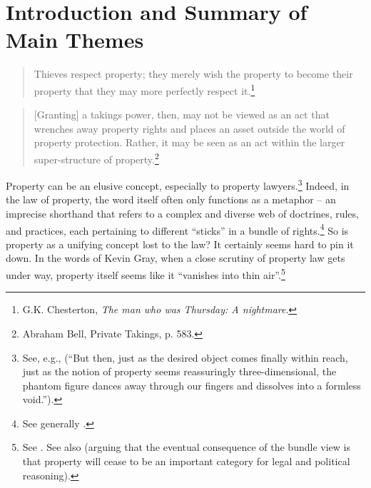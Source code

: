 \chapter{Introduction and Summary of Main Themes}\label{chap:intro}

\begin{quote}
Thieves respect property; they merely wish the property to become their property that they may more perfectly respect it.\footnote{G.K. Chesterton, {\it The man who was Thursday: A nightmare}.}
\end{quote}
\begin{quote}
[Granting] a takings power, then, may not be viewed as an act that wrenches away property rights and places an asset outside the world of property protection. Rather, it may be seen as an act within the larger super-structure of property.\footnote{Abraham Bell, Private Takings, p. 583.}
\end{quote}
%
%
%

Property can be an elusive concept, especially to property lawyers.\footnote{See, e.g., \cite{gray11} (``But then, just as the desired object comes finally within reach, just as the notion of property seems reassuringly three-dimensional, the phantom figure dances away through our fingers and dissolves into a formless void.'').} Indeed, in the law of property, the word itself often only functions as a metaphor -- an imprecise shorthand that refers to a complex and diverse web of doctrines, rules, and practices, each pertaining to different ``sticks'' in a bundle of rights.\footnote{See generally \cite{grey80,klein11}.} So is property as a unifying concept lost to the law? It certainly seems hard to pin it down. In the words of Kevin Gray, when a close scrutiny of property law gets under way, property itself seems like it ``vanishes into thin air''.\footnote{See \cite[306-307]{gray91}. See also \cite[81]{grey80} (arguing that the eventual consequence of the bundle view is that property will cease to be an important category for legal and political reasoning).} 

